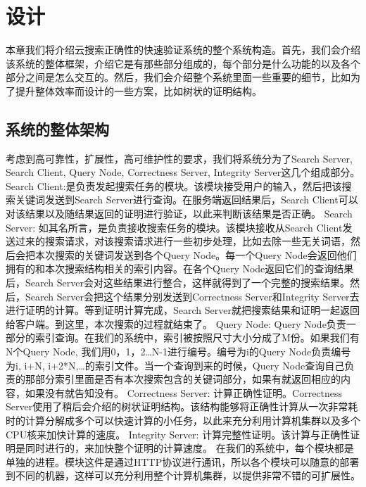 \chapter{设计}
\label{chap:design}


本章我们将介绍云搜索正确性的快速验证系统的整个系统构造。首先，我们会介绍该系统的整体框架，介绍它是有那些部分组成的，每个部分是什么功能的以及各个部分之间是怎么交互的。然后，我们会介绍整个系统里面一些重要的细节，比如为了提升整体效率而设计的一些方案，比如树状的证明结构。

\section{系统的整体架构}

考虑到高可靠性，扩展性，高可维护性的要求，我们将系统分为了Search Server, Search Client, Query Node, Correctness Server, Integrity Server这几个组成部分。
Search Client:是负责发起搜索任务的模块。该模块接受用户的输入，然后把该搜索关键词发送到Search Server进行查询。在服务端返回结果后，Search Client可以对该结果以及随结果返回的证明进行验证，以此来判断该结果是否正确。
Search Server: 如其名所言，是负责接收搜索任务的模块。该模块接收从Search Client发送过来的搜索请求，对该搜索请求进行一些初步处理，比如去除一些无关词语，然后会把本次搜索的关键词发送到各个Query Node。每一个Query Node会返回他们拥有的和本次搜索结构相关的索引内容。在各个Query Node返回它们的查询结果后，Search Server会对这些结果进行整合，这样就得到了一个完整的搜索结果。然后，Search Server会把这个结果分别发送到Correctness Server和Integrity Server去进行证明的计算。等到证明计算完成，Search Server就把搜索结果和证明一起返回给客户端。到这里，本次搜索的过程就结束了。
Query Node: Query Node负责一部分的索引查询。在我们的系统中，索引被按照尺寸大小分成了M份。如果我们有N个Query Node, 我们用0，1，2…N-1进行编号。编号为i的Query Node负责编号为i, i+N, i+2*N,…的索引文件。当一个查询到来的时候，Query Node查询自己负责的那部分索引里面是否有本次搜索包含的关键词部分，如果有就返回相应的内容，如果没有就告知没有。
Correctness Server: 计算正确性证明。Correctness Server使用了稍后会介绍的树状证明结构。该结构能够将正确性计算从一次非常耗时的计算分解成多个可以快速计算的小任务，以此来充分利用计算机集群以及多个CPU核来加快计算的速度。
Integrity Server: 计算完整性证明。该计算与正确性证明是同时进行的，来加快整个证明的计算速度。
在我们的系统中，每个模块都是单独的进程。模块这件是通过HTTP协议进行通讯，所以各个模块可以随意的部署到不同的机器，这样可以充分利用整个计算机集群，以提供非常不错的可扩展性。

